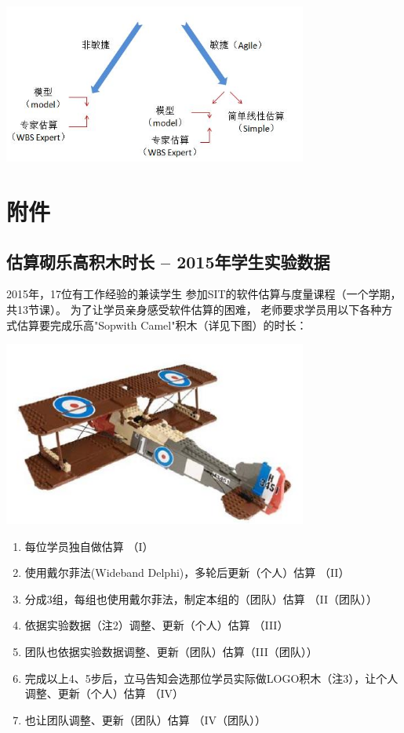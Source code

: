 
\includegraphics[width=10cm]{敏捷非敏捷1.jpg}

\hypertarget{ux9644ux4ef6}{%
\section{附件}\label{ux9644ux4ef6}}

\hypertarget{ux4f30ux7b97ux780cux4e50ux9ad8ux79efux6728ux65f6ux957f---2015ux5e74ux5b66ux751fux5b9eux9a8cux6570ux636e}{%
\subsection{估算砌乐高积木时长 --
2015年学生实验数据}\label{ux4f30ux7b97ux780cux4e50ux9ad8ux79efux6728ux65f6ux957f---2015ux5e74ux5b66ux751fux5b9eux9a8cux6570ux636e}}

2015年，17位有工作经验的兼读学生
参加SIT的软件估算与度量课程（一个学期，共13节课）。
为了让学员亲身感受软件估算的困难，
老师要求学员用以下各种方式估算要完成乐高"Sopwith
Camel"积木（详见下图）的时长：


\includegraphics[width=10cm]{Lego1.jpg}

\begin{enumerate}
\tightlist
\item
  每位学员独自做估算 （I）
\item
  使用戴尔菲法(Wideband Delphi)，多轮后更新（个人）估算 （II）
\item
  分成3组，每组也使用戴尔菲法，制定本组的（团队）估算 （II（团队））
\item
  依据实验数据（注2）调整、更新（个人）估算 （III）
\item
  团队也依据实验数据调整、更新（团队）估算（III（团队））
\item
  完成以上4、5步后，立马告知会选那位学员实际做LOGO积木（注3），让个人调整、更新（个人）估算
  （IV）
\item
  也让团队调整、更新（团队）估算 （IV（团队））
\end{enumerate}

